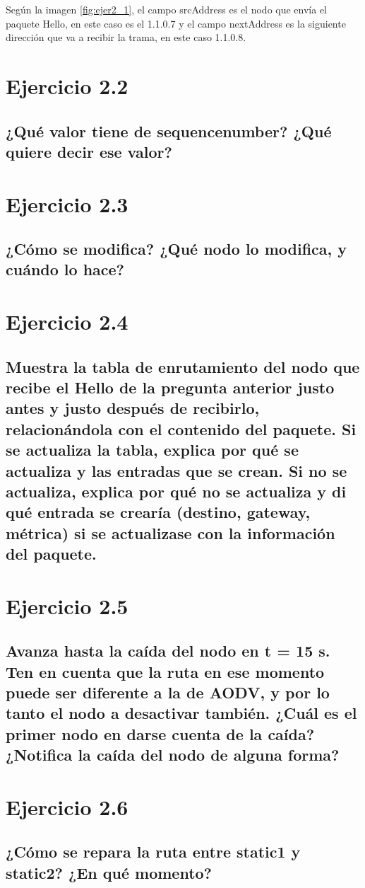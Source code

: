 Según la imagen \ref{fig:ejer2_1}, el campo srcAddress es el nodo que envía el paquete Hello, en este caso es el 1.1.0.7 y el campo nextAddress es la siguiente dirección que va a recibir la trama, en este caso 1.1.0.8. 



\section{Ejercicio 2.2}

\subsection{¿Qué valor tiene de sequencenumber? ¿Qué quiere decir ese valor?}

\section{Ejercicio 2.3}

\subsection{¿Cómo se modifica? ¿Qué nodo lo modifica, y cuándo lo hace?}

\section{Ejercicio 2.4}

\subsection{Muestra la tabla de enrutamiento del nodo que recibe el Hello de la pregunta anterior justo antes y justo
después de recibirlo, relacionándola con el contenido del paquete. Si se actualiza la tabla, explica por qué se
actualiza y las entradas que se crean. Si no se actualiza, explica por qué no se actualiza y di qué entrada se
crearía (destino, gateway, métrica) si se actualizase con la información del paquete.}

\section{Ejercicio 2.5}

\subsection{Avanza hasta la caída del nodo en t = 15 s. Ten en cuenta que la ruta en ese momento puede ser diferente a
la de AODV, y por lo tanto el nodo a desactivar también. ¿Cuál es el primer nodo en darse cuenta de la caída?
¿Notifica la caída del nodo de alguna forma?}

\section{Ejercicio 2.6}

\subsection{¿Cómo se repara la ruta entre static1 y static2? ¿En qué momento?}

